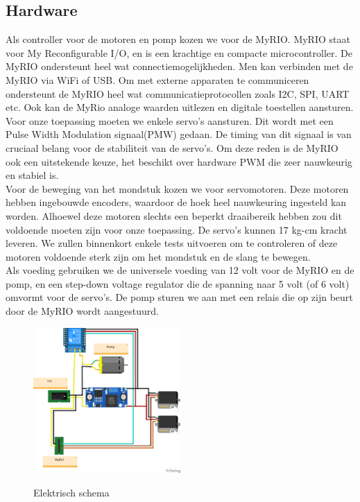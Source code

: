 \documentclass{kulakarticle}
\begin{document}
\subsection{Hardware}
Als controller voor de motoren en pomp kozen we voor de MyRIO. 
MyRIO staat voor My Reconfigurable I/O, en is een krachtige en compacte microcontroller. De MyRIO ondersteunt heel wat connectiemogelijkheden. Men kan  verbinden met de MyRIO via WiFi of USB. Om met externe apparaten te communiceren ondersteunt de MyRIO heel wat communicatieprotocollen zoals I2C, SPI, UART etc. Ook kan de MyRio analoge waarden uitlezen en digitale toestellen aansturen. Voor onze toepassing moeten we enkele servo's aansturen. Dit wordt met een Pulse Width Modulation signaal(PMW) gedaan. De timing van dit signaal is van cruciaal belang voor de stabiliteit van de servo's. Om deze reden is de MyRIO ook een uitstekende keuze, het beschikt over hardware PWM die zeer nauwkeurig en stabiel is.\\
Voor de beweging van het mondstuk kozen we voor servomotoren. Deze motoren hebben ingebouwde encoders, waardoor de hoek heel nauwkeuring ingesteld kan worden. Alhoewel deze motoren slechts een beperkt draaibereik hebben zou dit voldoende moeten zijn voor onze toepassing. De servo's kunnen 17 kg-cm kracht leveren. We zullen binnenkort enkele tests uitvoeren om te controleren of deze motoren voldoende sterk zijn om het mondstuk en de slang te bewegen. \\
Als voeding gebruiken we de universele voeding van 12 volt voor de MyRIO en de pomp, en een step-down voltage regulator die de spanning naar 5 volt (of 6 volt) omvormt voor de servo's. 
De pomp sturen we aan met een relais die op zijn beurt door de MyRIO wordt aangestuurd.

\begin{figure}[H]
\begin{center}

    \label{fig:Schema}
    \includegraphics[width=0.5\textwidth]{Afbeeldingen/Schema.png}
    \caption{Elektrisch schema}

\end{center}
\end{figure}
\end{document}
